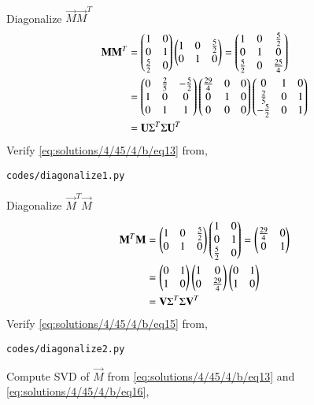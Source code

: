 \\
Diagonalize $\vec{M}\vec{M}^T$
\begin{align}
	\label{eq:solutions/4/45/4/b/eq12}\mathbf{M}\mathbf{M}^T &= \begin{pmatrix}1 & 0\\0 & 1\\\frac{5}{2} & 0\end{pmatrix}\begin{pmatrix}1 & 0 & \frac{5}{2}\\0 & 1 & 0\end{pmatrix} = \begin{pmatrix}1 & 0 & \frac{5}{2}\\0 & 1 & 0\\\frac{5}{2} & 0 & \frac{25}{4}\end{pmatrix}\\
	\label{eq:solutions/4/45/4/b/eq13}&= \begin{pmatrix}0 & \frac{2}{5} & -\frac{5}{2}\\1 & 0 & 0\\0 & 1 & 1\end{pmatrix}\begin{pmatrix}\frac{29}{4} & 0 & 0\\0 & 1 & 0\\0 & 0 & 0\end{pmatrix}\begin{pmatrix}0 & 1 & 0\\\frac{2}{5} & 0 & 1\\-\frac{5}{2} & 0 & 1\end{pmatrix}\\
	&= \mathbf{U}\Sigma^T\Sigma\mathbf{U}^T
\end{align}
Verify \eqref{eq:solutions/4/45/4/b/eq13} from,
\begin{lstlisting}
codes/diagonalize1.py
\end{lstlisting}
Diagonalize $\vec{M}^T\vec{M}$
\begin{align}
	\label{eq:solutions/4/45/4/b/e14}\mathbf{M}^T\mathbf{M} &= \begin{pmatrix}1 & 0 & \frac{5}{2}\\0 & 1 & 0\end{pmatrix}\begin{pmatrix}1 & 0\\0 & 1\\\frac{5}{2} & 0\end{pmatrix} = \begin{pmatrix}\frac{29}{4} & 0\\0 & 1\end{pmatrix}\\
	\label{eq:solutions/4/45/4/b/eq15}&= \begin{pmatrix}0 & 1\\1 & 0\end{pmatrix}\begin{pmatrix}1 & 0\\0 & \frac{29}{4}\end{pmatrix}\begin{pmatrix}0 & 1\\1 & 0\end{pmatrix}\\
	&= \mathbf{V}\Sigma^T\Sigma\mathbf{V}^T
\end{align}
Verify \eqref{eq:solutions/4/45/4/b/eq15} from,
\begin{lstlisting}
codes/diagonalize2.py
\end{lstlisting}
Compute SVD of $\vec{M}$ from \eqref{eq:solutions/4/45/4/b/eq13} and \eqref{eq:solutions/4/45/4/b/eq16},
